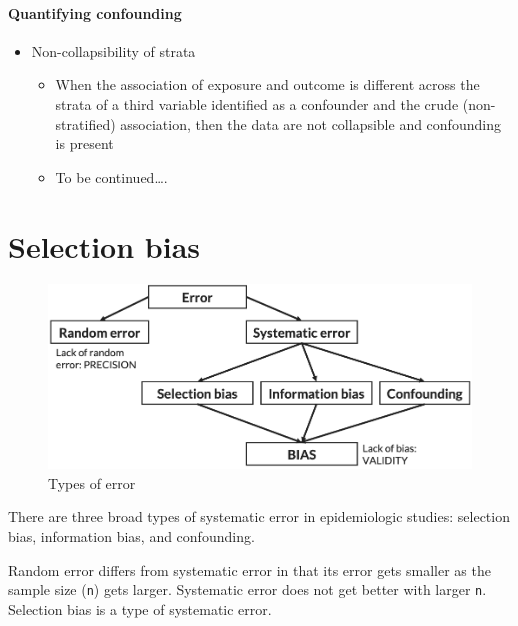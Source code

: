 \documentclass[
]{book}
\providecommand{\tightlist}{%
  \setlength{\itemsep}{0pt}\setlength{\parskip}{0pt}}
\begin{document}
\hypertarget{quantifying-confounding}{%
\subsubsection{Quantifying confounding}\label{quantifying-confounding}}

\begin{itemize}
\tightlist
\item
  Non-collapsibility of strata

  \begin{itemize}
  \tightlist
  \item
    When the association of exposure and outcome is different across the strata of a third variable identified as a confounder and the crude (non-stratified) association, then the data are not collapsible and confounding is present
  \item
    To be continued\ldots.
  \end{itemize}
\end{itemize}

\hypertarget{selection-bias}{%
\chapter{Selection bias}\label{selection-bias}}

\begin{figure}

{\centering \includegraphics[width=1\linewidth]{img/selection-bias/types_of_error} 

}

\caption{Types of error}\label{fig:unnamed-chunk-21}
\end{figure}

There are three broad types of systematic error in epidemiologic studies: selection bias, information bias, and confounding.

Random error differs from systematic error in that its error gets smaller as the sample size (\texttt{n}) gets larger. Systematic error does not get better with larger \texttt{n}. Selection bias is a type of systematic error.
\end{document}
